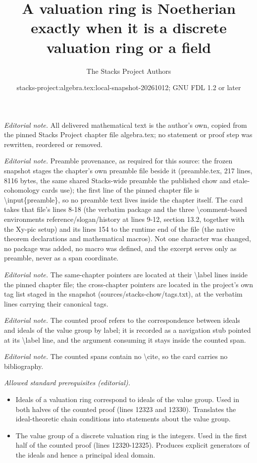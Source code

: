 \documentclass[10pt,a4paper]{amsart}
\title{A valuation ring is Noetherian exactly when it is a discrete valuation ring or a field}
\author{The Stacks Project Authors}
\date{stacks-project:algebra.tex:local-snapshot-20261012; GNU FDL 1.2 or later}
\theoremstyle{plain}
\theoremstyle{definition}
\theoremstyle{remark}
\numberwithin{equation}{subsection}
\begin{document}
\maketitle
\noindent\textit{Editorial note.} All delivered mathematical text is the author's own, copied from the pinned Stacks Project chapter file algebra.tex; no statement or proof step was rewritten, reordered or removed.\par\medskip
\noindent\textit{Editorial note.} Preamble provenance, as required for this source: the frozen snapshot stages the chapter's own preamble file beside it (preamble.tex, 217 lines, 8116 bytes, the same shared Stacks-wide preamble the published chow and etale-cohomology cards use); the first line of the pinned chapter file is \textbackslash{}input\{preamble\}, so no preamble text lives inside the chapter itself. The card takes that file's lines 8-18 (the verbatim package and the three \textbackslash{}comment-based environments reference/slogan/history at lines 9-12, section 13.2, together with the Xy-pic setup) and its lines 154 to the runtime end of the file (the native theorem declarations and mathematical macros). Not one character was changed, no package was added, no macro was defined, and the excerpt serves only as preamble, never as a span coordinate.\par\medskip
\noindent\textit{Editorial note.} The same-chapter pointers are located at their \textbackslash{}label lines inside the pinned chapter file; the cross-chapter pointers are located in the project's own tag list staged in the snapshot (sources/stacks-chow/tags.txt), at the verbatim lines carrying their canonical tags.\par\medskip
\noindent\textit{Editorial note.} The counted proof refers to the correspondence between ideals and ideals of the value group by label; it is recorded as a navigation stub pointed at its \textbackslash{}label line, and the argument consuming it stays inside the counted span.\par\medskip
\noindent\textit{Editorial note.} The counted spans contain no \textbackslash{}cite, so the card carries no bibliography.\par\medskip
\noindent\textit{Allowed standard prerequisites (editorial).}\begin{itemize}
\item Ideals of a valuation ring correspond to ideals of the value group. Used in both halves of the counted proof (lines 12323 and 12330). Translates the ideal-theoretic chain conditions into statements about the value group.
\item The value group of a discrete valuation ring is the integers. Used in the first half of the counted proof (lines 12320-12325). Produces explicit generators of the ideals and hence a principal ideal domain.
\end{itemize}\medskip
\end{document}
